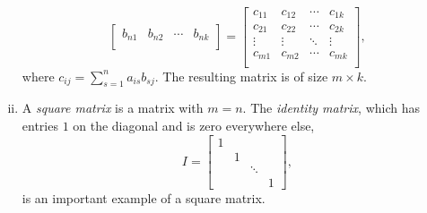 \begin{definition}[Matrices]
\begin{enumerate}[(i)]
\begin{equation*}
\begin{bmatrix}
		b_{n1} & b_{n2} & \cdots & b_{nk} \\
		\end{bmatrix}
		= \begin{bmatrix}
		c_{11} & c_{12} & \cdots & c_{1k} \\
		c_{21} & c_{22} & \cdots & c_{2k} \\
		\vdots & \vdots & \ddots & \vdots \\
		c_{m1} & c_{m2} & \cdots & c_{mk} \\
		\end{bmatrix},
		\end{equation*}
		where $c_{ij} = \sum_{s=1}^n a_{is}b_{sj}$. The resulting matrix is of size $m \times k$.
	\item A \emph{square matrix} is a matrix with $m=n$. The \emph{identity matrix}, which has entries $1$ on the diagonal and is zero everywhere else,
	\[ I = \begin{bmatrix} 1 & & & \\ & 1 & & \\ & & \ddots & \\ & & & 1 \end{bmatrix},\]
	is an important example of a square matrix.
		
\end{enumerate}
\end{definition}

